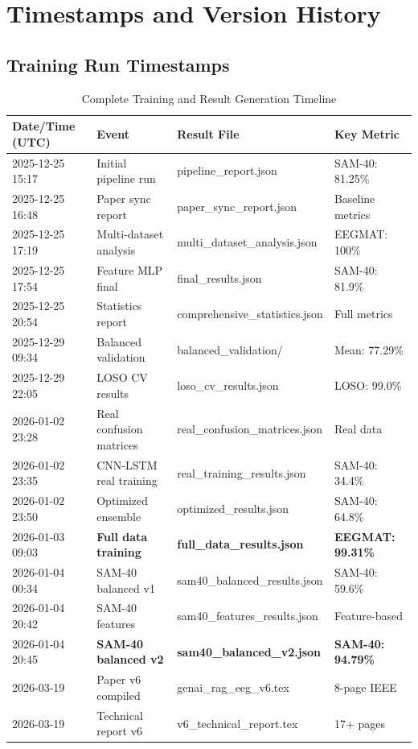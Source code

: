 \documentclass[11pt,a4paper]{article}
\begin{document}
\section{Timestamps and Version History}

\subsection{Training Run Timestamps}

\begin{table}[H]
\centering
\caption{Complete Training and Result Generation Timeline}
\small
\begin{tabular}{llll}
\toprule
\textbf{Date/Time (UTC)} & \textbf{Event} & \textbf{Result File} & \textbf{Key Metric} \\
\midrule
2025-12-25 15:17 & Initial pipeline run & pipeline\_report.json & SAM-40: 81.25\% \\
2025-12-25 16:48 & Paper sync report & paper\_sync\_report.json & Baseline metrics \\
2025-12-25 17:19 & Multi-dataset analysis & multi\_dataset\_analysis.json & EEGMAT: 100\% \\
2025-12-25 17:54 & Feature MLP final & final\_results.json & SAM-40: 81.9\% \\
2025-12-25 20:54 & Statistics report & comprehensive\_statistics.json & Full metrics \\
2025-12-29 09:34 & Balanced validation & balanced\_validation/ & Mean: 77.29\% \\
2025-12-29 22:05 & LOSO CV results & loso\_cv\_results.json & LOSO: 99.0\% \\
2026-01-02 23:28 & Real confusion matrices & real\_confusion\_matrices.json & Real data \\
2026-01-02 23:35 & CNN-LSTM real training & real\_training\_results.json & SAM-40: 34.4\% \\
2026-01-02 23:50 & Optimized ensemble & optimized\_results.json & SAM-40: 64.8\% \\
2026-01-03 09:03 & \textbf{Full data training} & \textbf{full\_data\_results.json} & \textbf{EEGMAT: 99.31\%} \\
2026-01-04 00:34 & SAM-40 balanced v1 & sam40\_balanced\_results.json & SAM-40: 59.6\% \\
2026-01-04 20:42 & SAM-40 features & sam40\_features\_results.json & Feature-based \\
2026-01-04 20:45 & \textbf{SAM-40 balanced v2} & \textbf{sam40\_balanced\_v2.json} & \textbf{SAM-40: 94.79\%} \\
\midrule
2026-03-19 & Paper v6 compiled & genai\_rag\_eeg\_v6.tex & 8-page IEEE \\
2026-03-19 & Technical report v6 & v6\_technical\_report.tex & 17+ pages \\
\bottomrule
\end{tabular}
\end{table}
\end{document}
